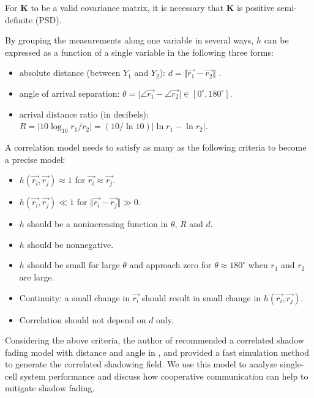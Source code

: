 For $\mathbf{K}$ to be a valid covariance matrix, it is necessary that $\mathbf{K}$ is positive semi-definite (PSD).
\par By grouping the measurements along one variable in several ways, $h$ can be expressed as a function of a single variable in the following three forms:
\begin{itemize}
\item absolute distance (between $Y_{1}$ and $Y_{2}$): $d = \Vert \vec{r_{1}}- \vec{r_{2}}\Vert$ .
\item angle of arrival separation: $\theta = \vert\angle\vec{r_{1}}-\angle\vec{r_{2}}\vert\in [0^\circ, 180^\circ]$. 
\item arrival distance ratio (in decibels): $R=\vert10\log_{10}r_{1}/r_{2}\vert=(10/\ln 10)\vert \ln r_{1}-\ln r_{2}\vert$.
\end{itemize}
A correlation model needs to satisfy as many as the following criteria to become a precise model:
\begin{itemize}
\item $h(\vec{r_{i}}, \vec{r_{j}}) \approx 1$ for $\vec{r_{i}}\approx \vec{r_{j}}$.
\item $h(\vec{r_{i}}, \vec{r_{j}}) \ll 1$ for $\Vert \vec{r_{i}}- \vec{r_{j}}\Vert\gg0$.
\item $h$ should be a nonincreasing function in $\theta$, $R$ and $d$.
\item $h$ should be nonnegative.
\item $h$ should be small for large $\theta$ and approach zero for $\theta\approx180^\circ$ when $r_{1}$ and $r_{2}$ are large.
\item Continuity: a small change in $\vec{r_{i}}$ should result in small change in $h(\vec{r_{i}}, \vec{r_{j}})$.
\item Correlation should not depend on $d$ only.
\end{itemize}
Considering the above criteria, the author of \cite{szyszkowicz2010feasibility} recommended a correlated shadow fading model with distance and angle in \cite{szyszkowicz2011interference}, and provided a fast simulation method to generate the correlated shadowing field. We use this model to analyze single-cell system performance and discuss how cooperative communication can help to mitigate shadow fading. 

